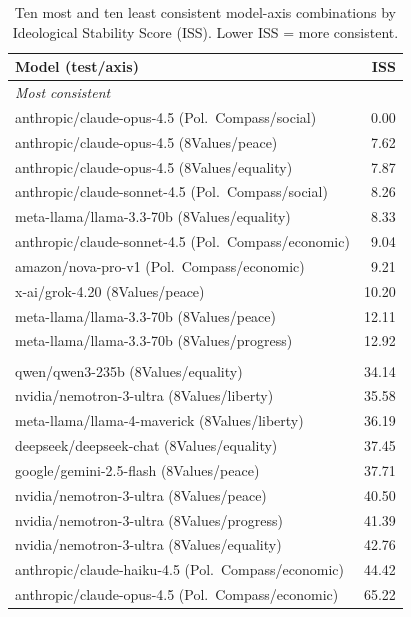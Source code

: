 \documentclass[11pt]{article}
\begin{document}
\begin{table}[H]
\centering
\caption{Ten most and ten least consistent model-axis combinations by Ideological Stability Score (ISS). Lower ISS = more consistent.}
\label{stab:iss-extremes}
\footnotesize
\begin{tabular}{lr}
\toprule
Model (test/axis) & ISS \\
\midrule
\multicolumn{2}{l}{\textit{Most consistent}} \\
anthropic/claude-opus-4.5 (Pol.\ Compass/social) & 0.00 \\
anthropic/claude-opus-4.5 (8Values/peace)        & 7.62 \\
anthropic/claude-opus-4.5 (8Values/equality)     & 7.87 \\
anthropic/claude-sonnet-4.5 (Pol.\ Compass/social) & 8.26 \\
meta-llama/llama-3.3-70b (8Values/equality)      & 8.33 \\
anthropic/claude-sonnet-4.5 (Pol.\ Compass/economic) & 9.04 \\
amazon/nova-pro-v1 (Pol.\ Compass/economic)      & 9.21 \\
x-ai/grok-4.20 (8Values/peace)                    & 10.20 \\
meta-llama/llama-3.3-70b (8Values/peace)          & 12.11 \\
meta-llama/llama-3.3-70b (8Values/progress)       & 12.92 \\
\addlinespace
\multicolumn{2}{l}{\textit{Least consistent}} \\
qwen/qwen3-235b (8Values/equality)               & 34.14 \\
nvidia/nemotron-3-ultra (8Values/liberty)         & 35.58 \\
meta-llama/llama-4-maverick (8Values/liberty)     & 36.19 \\
deepseek/deepseek-chat (8Values/equality)         & 37.45 \\
google/gemini-2.5-flash (8Values/peace)           & 37.71 \\
nvidia/nemotron-3-ultra (8Values/peace)           & 40.50 \\
nvidia/nemotron-3-ultra (8Values/progress)        & 41.39 \\
nvidia/nemotron-3-ultra (8Values/equality)        & 42.76 \\
anthropic/claude-haiku-4.5 (Pol.\ Compass/economic) & 44.42 \\
anthropic/claude-opus-4.5 (Pol.\ Compass/economic) & 65.22 \\
\bottomrule
\end{tabular}
\end{table}
\end{document}
